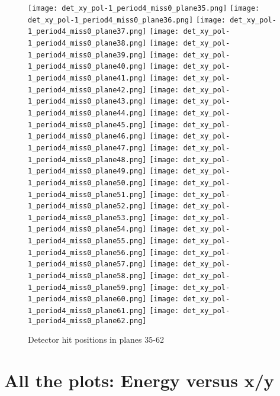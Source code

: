   
        \begin{figure}[h]	   
 \centering
        	\texttt{[image: det\_xy\_pol-1\_period4\_miss0\_plane35.png]}
	 	\texttt{[image: det\_xy\_pol-1\_period4\_miss0\_plane36.png]}
		 	\texttt{[image: det\_xy\_pol-1\_period4\_miss0\_plane37.png]}
			 	\texttt{[image: det\_xy\_pol-1\_period4\_miss0\_plane38.png]}
				\texttt{[image: det\_xy\_pol-1\_period4\_miss0\_plane39.png]}	 
        	\texttt{[image: det\_xy\_pol-1\_period4\_miss0\_plane40.png]}
	 	\texttt{[image: det\_xy\_pol-1\_period4\_miss0\_plane41.png]}
		 	\texttt{[image: det\_xy\_pol-1\_period4\_miss0\_plane42.png]}
			 	\texttt{[image: det\_xy\_pol-1\_period4\_miss0\_plane43.png]}
				\texttt{[image: det\_xy\_pol-1\_period4\_miss0\_plane44.png]}					
        	\texttt{[image: det\_xy\_pol-1\_period4\_miss0\_plane45.png]}
	 	\texttt{[image: det\_xy\_pol-1\_period4\_miss0\_plane46.png]}
		 	\texttt{[image: det\_xy\_pol-1\_period4\_miss0\_plane47.png]}
			 	\texttt{[image: det\_xy\_pol-1\_period4\_miss0\_plane48.png]}
				\texttt{[image: det\_xy\_pol-1\_period4\_miss0\_plane49.png]}
        	\texttt{[image: det\_xy\_pol-1\_period4\_miss0\_plane50.png]}
	 	\texttt{[image: det\_xy\_pol-1\_period4\_miss0\_plane51.png]}
		 	\texttt{[image: det\_xy\_pol-1\_period4\_miss0\_plane52.png]}
			 	\texttt{[image: det\_xy\_pol-1\_period4\_miss0\_plane53.png]}
				\texttt{[image: det\_xy\_pol-1\_period4\_miss0\_plane54.png]}
        	\texttt{[image: det\_xy\_pol-1\_period4\_miss0\_plane55.png]}
	 	\texttt{[image: det\_xy\_pol-1\_period4\_miss0\_plane56.png]}
		 	\texttt{[image: det\_xy\_pol-1\_period4\_miss0\_plane57.png]}
			 	\texttt{[image: det\_xy\_pol-1\_period4\_miss0\_plane58.png]}
				\texttt{[image: det\_xy\_pol-1\_period4\_miss0\_plane59.png]}
        	\texttt{[image: det\_xy\_pol-1\_period4\_miss0\_plane60.png]}
	 	\texttt{[image: det\_xy\_pol-1\_period4\_miss0\_plane61.png]}
		 	\texttt{[image: det\_xy\_pol-1\_period4\_miss0\_plane62.png]}
\caption{Detector hit positions in planes 35-62}			
   \label{fig_dethit_last}
  \end{figure}
  
  
  
  

  \section{All the plots: Energy versus x/y}\label{app_PE_XY}
  
